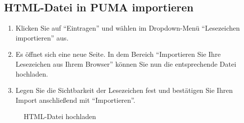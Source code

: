 \subsection{HTML-Datei in PUMA importieren}
\begin{enumerate}
    \item Klicken Sie auf \enquote{Eintragen} und wählen im Dropdown-Menü \enquote{Lesezeichen importieren} aus.
    \item Es öffnet sich eine neue Seite. In dem Bereich \enquote{Importieren Sie Ihre Lesezeichen aus Ihrem Browser} können Sie nun die entsprechende Datei hochladen. 
    \item Legen Sie die Sichtbarkeit der Lesezeichen fest und bestätigen Sie Ihren Import anschließend mit \enquote{Importieren}.
\end{enumerate}
\begin{figure}[h!]
 \centering
 \caption{HTML-Datei hochladen}
 \label{figure017}
\end{figure}
